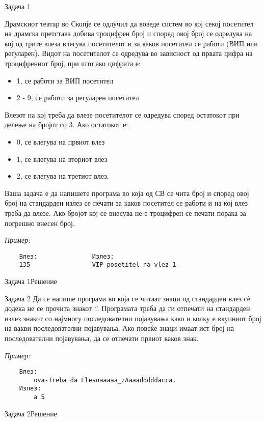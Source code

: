 
\begin{frame}[fragile]{Задача 1}
\begin{tiny}
Драмскиот театар во Скопје се одлучил да воведе систем во кој секој посетител
на драмска претстава добива троцифрен број и според овој број се одредува на кој
од трите влеза влегува посетителот и за каков посетител се работи (ВИП или
регуларен). Видот на посетителот се одредува во зависност од првата цифра на
троцифрениот број, при што ако цифрата е: 
\begin{itemize}
  \item 1, се работи за ВИП посетител
  \item 2 - 9, се работи за регуларен посетител  
\end{itemize}

Влезот на кој треба да влезе посетителот се одредува според остатокот при делење
на бројот со 3. Ако остатокот е: 
\begin{itemize}
  \item 0, се влегува на првиот влез
  \item 1, се влегува на вториот влез
  \item 2, се влегува на третиот влез.  
\end{itemize}
Ваша задача е да напишете програма во која од СВ се чита број и според овој број
на стандарден излез се печати за каков посетител се работи и на кој влез треба
да влезе. Ако бројот кој се внесува не е троцифрен се печати порака за погрешно внесен број.


\emph{Пример}:
\begin{verbatim}
	Влез:				Излез:
    135				    VIP posetitel na vlez 1
\end{verbatim}
\end{tiny}

\end{frame}

\begin{frame}[fragile]{Задача 1}{Решение}

\end{frame}

\begin{frame}[fragile]{Задача 2}
Да се напише програма во која се читаат знаци од стандарден влез сѐ додека не се
прочита знакот ‘.’. Програмата треба да ги отпечати на стандарден излез знакот
со најмногу последователни појавувања како и колку е вкупниот број на вакви
последователни појавувања. Ако повеќе знаци имаат ист број на последователни
појавувања, да се отпечати првиот ваков знак.

\emph{Пример:}
\begin{verbatim}
	Влез:				
		ova-Treba da Elesnaaaaa_zAaaadddddacca.
	Излез: 
		a 5
\end{verbatim}
\end{frame}
\begin{frame}[fragile,shrink=.95]{Задача 2}{Решение}

\end{frame}


